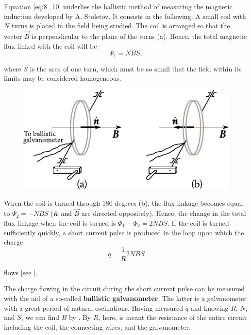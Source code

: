 Equation \eqref{eq:8_10} underlies the ballistic method of measuring the magnetic induction developed by A. Stoletov.
It consists in the following.
A small coil with $N$ turns is placed in the field being studied.
The coil is arranged so that the vector $\vec{B}$ is perpendicular to the plane of the turns (a).
Hence, the total magnetic flux linked with the coil will be
\begin{equation*}
	\Psi_1 = NBS,
\end{equation*}

\noindent
where $S$ is the area of one turn, which must be so small that the field within its limits may be considered homogeneous.

\begin{figure}[t]
	\begin{center}
		\includegraphics[scale=1]{figures/ch_08/fig_8_4.pdf}
		\caption[]{}
		\label{fig:8_4}
	\end{center}
	\vspace{-0.8cm}
\end{figure}

When the coil is turned through $180$ degrees (b), the flux linkage becomes equal to $\Psi_2=-NBS$ ($\hat{\boldsymbol{n}}$ and $\vec{B}$ are directed oppositely).
Hence, the change in the total flux linkage when the coil is turned is $\Psi_1 - \Psi_2 = 2NBS$. If the coil is turned sufficiently quickly, a short current pulse is produced in the loop upon which the charge
\begin{equation}\label{eq:8_11}
	q = \frac{1}{R} 2NBS
\end{equation}

\noindent
flows [see ].

The charge flowing in the circuit during the short current pulse can be measured with the aid of a so-called \textbf{ballistic galvanometer}.
The latter is a galvanometer with a great period of natural oscillations.
Having measured $q$ and knowing $R$, $N$, and $S$, we can find $B$ by .
By $R$, here, is meant the resistance of the entire circuit including the coil, the connecting wires, and the galvanometer.

